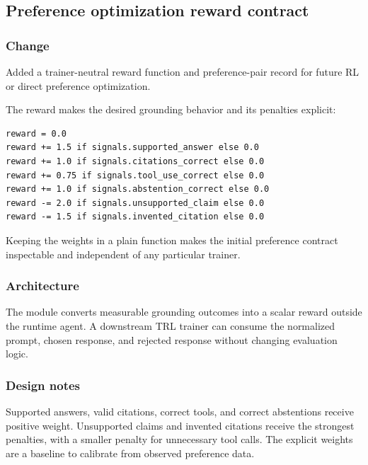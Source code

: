 
\subsection{Preference optimization reward contract}


\subsubsection{Change}

Added a trainer-neutral reward function and preference-pair record for future RL or direct preference optimization.

The reward makes the desired grounding behavior and its penalties explicit:

\begin{verbatim}
reward = 0.0
reward += 1.5 if signals.supported_answer else 0.0
reward += 1.0 if signals.citations_correct else 0.0
reward += 0.75 if signals.tool_use_correct else 0.0
reward += 1.0 if signals.abstention_correct else 0.0
reward -= 2.0 if signals.unsupported_claim else 0.0
reward -= 1.5 if signals.invented_citation else 0.0
\end{verbatim}

Keeping the weights in a plain function makes the initial preference contract inspectable and independent of any particular trainer.

\subsubsection{Architecture}

The module converts measurable grounding outcomes into a scalar reward outside the runtime agent. A downstream TRL trainer can consume the normalized prompt, chosen response, and rejected response without changing evaluation logic.

\subsubsection{Design notes}

Supported answers, valid citations, correct tools, and correct abstentions receive positive weight. Unsupported claims and invented citations receive the strongest penalties, with a smaller penalty for unnecessary tool calls. The explicit weights are a baseline to calibrate from observed preference data.

